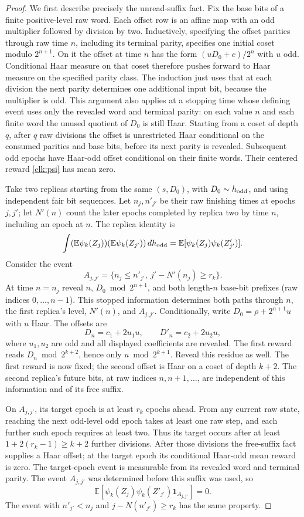 \documentclass[11pt]{amsart}
\theoremstyle{definition}
\theoremstyle{remark}
\newcommand{\E}{\mathbb E}
\newcommand{\one}{\mathbf 1}
\begin{document}
\begin{proof}
We first describe precisely the unread-suffix fact. Fix the base bits
of a finite positive-level raw word. Each offset row is an affine map
with an odd multiplier followed by division by two. Inductively,
specifying the offset parities through raw time $n$, including its
terminal parity, specifies one initial coset modulo $2^{n+1}$.
On it the offset at time $n$ has the form
$(uD_0+c)/2^n$ with $u$ odd. Conditional Haar measure on that coset
therefore pushes forward to Haar measure on the specified parity class.
The induction just uses that at each division the next parity determines
one additional input bit, because the multiplier is odd. This argument
also applies at a stopping time whose defining event uses only the
revealed word and terminal parity: on each value $n$ and each finite
word the unused quotient of $D_0$ is still Haar. Starting from a coset of depth $q$, after $q$ raw divisions the
offset is unrestricted Haar conditional on the consumed parities and
base bits, before its next parity is revealed. Subsequent odd epochs
have Haar-odd offset conditional on their finite words. Their centered reward \eqref{clk:psi} has mean zero.

Take two replicas starting from the same $(s,D_0)$, with
$D_0\sim h_{\rm odd}$, and using independent fair bit sequences.
Let $n_j,n'_{j'}$ be their raw finishing times at epochs $j,j'$;
let $N'(n)$ count the later epochs completed by replica two by time
$n$, including an epoch at $n$. The replica identity is
\[
 \int (\E\psi_k(Z_j))(\E\psi_k(Z_{j'}))\,dh_{\rm odd}
       =\E[\psi_k(Z_j)\psi_k(Z'_{j'})].
\]
Consider the event
\[
 A_{j,j'}=\{n_j\le n'_{j'},\ j'-N'(n_j)\ge r_k\}.
\]
At time $n=n_j$ reveal $n$, $D_0\bmod2^{n+1}$, and both length-$n$
base-bit prefixes (raw indices $0,\ldots,n-1$). This stopped information determines both paths
through $n$, the first replica's level, $N'(n)$, and $A_{j,j'}$.
Conditionally, write $D_0=\rho+2^{n+1}u$ with $u$ Haar. The offsets
are
\[
 D_n=c_1+2u_1u,\qquad D'_n=c_2+2u_2u,
\]
where $u_1,u_2$ are odd and all displayed coefficients are revealed.
The first reward reads $D_n\bmod2^{k+2}$, hence only
$u\bmod2^{k+1}$. Reveal this residue as well. The first reward is
now fixed; the second offset is Haar on a coset of depth $k+2$.
The second replica's future bits, at raw indices $n,n+1,\ldots$, are
independent of this information and of its free suffix.

On $A_{j,j'}$, its target epoch is at least $r_k$ epochs ahead.
From any current raw state, reaching the next odd-level odd epoch
takes at least one raw step, and each further such epoch requires at
least two. Thus its target occurs after at least
$1+2(r_k-1)\ge k+2$ further divisions. After those divisions the
free-suffix fact supplies a Haar offset; at the target epoch its
conditional Haar-odd mean reward is zero. The target-epoch event is
measurable from its revealed word and terminal parity. The event $A_{j,j'}$
was determined before this suffix was used, so
\[
 \E[\psi_k(Z_j)\psi_k(Z'_{j'})\one_{A_{j,j'}}]=0.
\]
The event with $n'_{j'}<n_j$ and $j-N(n'_{j'})\ge r_k$ has the
same property.


\end{proof}
\end{document}
